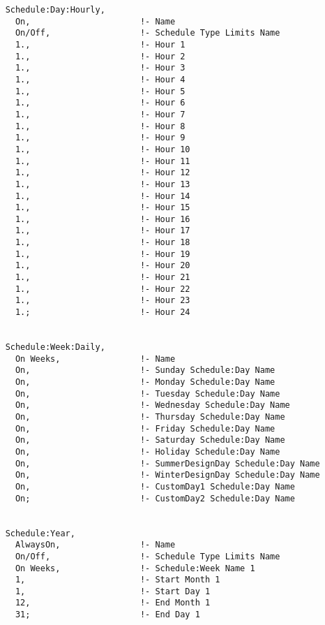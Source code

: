 \begin{lstlisting}
    Schedule:Day:Hourly,
      On,                      !- Name
      On/Off,                  !- Schedule Type Limits Name
      1.,                      !- Hour 1
      1.,                      !- Hour 2
      1.,                      !- Hour 3
      1.,                      !- Hour 4
      1.,                      !- Hour 5
      1.,                      !- Hour 6
      1.,                      !- Hour 7
      1.,                      !- Hour 8
      1.,                      !- Hour 9
      1.,                      !- Hour 10
      1.,                      !- Hour 11
      1.,                      !- Hour 12
      1.,                      !- Hour 13
      1.,                      !- Hour 14
      1.,                      !- Hour 15
      1.,                      !- Hour 16
      1.,                      !- Hour 17
      1.,                      !- Hour 18
      1.,                      !- Hour 19
      1.,                      !- Hour 20
      1.,                      !- Hour 21
      1.,                      !- Hour 22
      1.,                      !- Hour 23
      1.;                      !- Hour 24


    Schedule:Week:Daily,
      On Weeks,                !- Name
      On,                      !- Sunday Schedule:Day Name
      On,                      !- Monday Schedule:Day Name
      On,                      !- Tuesday Schedule:Day Name
      On,                      !- Wednesday Schedule:Day Name
      On,                      !- Thursday Schedule:Day Name
      On,                      !- Friday Schedule:Day Name
      On,                      !- Saturday Schedule:Day Name
      On,                      !- Holiday Schedule:Day Name
      On,                      !- SummerDesignDay Schedule:Day Name
      On,                      !- WinterDesignDay Schedule:Day Name
      On,                      !- CustomDay1 Schedule:Day Name
      On;                      !- CustomDay2 Schedule:Day Name


    Schedule:Year,
      AlwaysOn,                !- Name
      On/Off,                  !- Schedule Type Limits Name
      On Weeks,                !- Schedule:Week Name 1
      1,                       !- Start Month 1
      1,                       !- Start Day 1
      12,                      !- End Month 1
      31;                      !- End Day 1
\end{lstlisting}
